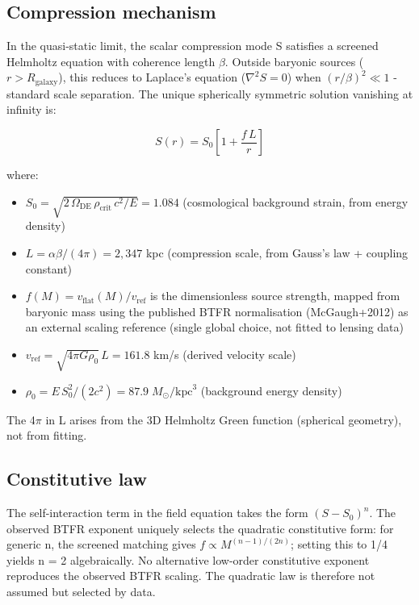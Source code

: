\documentclass[11pt,a4paper]{article}
\begin{document}
\subsection{Compression mechanism}
In the quasi-static limit, the scalar compression mode S satisfies a screened Helmholtz equation with coherence length $\beta$. Outside baryonic sources (\(r > R_{\mathrm{galaxy}}\)), this reduces to Laplace's equation (\(\nabla^2 S = 0\)) when \((r/\beta)^2 \ll 1\)  -  standard scale separation. The unique spherically symmetric solution vanishing at infinity is:

\[ S(r) = S_0\left[1 + \frac{f\,L}{r}\right] \]

where:

\begin{itemize}
  \item \(S_0 = \sqrt{2\,\Omega_{\mathrm{DE}}\,\rho_{\mathrm{crit}}\,c^2 / E} = 1.084\) (cosmological background strain, from energy density)
  \item \(L = \alpha\beta / (4\pi) = 2{,}347\) kpc (compression scale, from Gauss's law + coupling constant)
  \item \(f(M) = v_{\mathrm{flat}}(M) / v_{\mathrm{ref}}\) is the dimensionless source strength, mapped from baryonic mass using the published BTFR normalisation (McGaugh+2012) as an external scaling reference (single global choice, not fitted to lensing data)
  \item \(v_{\mathrm{ref}} = \sqrt{4\pi G\rho_0}\,L = 161.8\) km/\allowbreak{}s (derived velocity scale)
  \item \(\rho_0 = E\,S_0^2 / (2c^2) = 87.9\;M_\odot/\mathrm{kpc}^3\) (background energy density)
\end{itemize}

The 4$\pi$ in L arises from the 3D Helmholtz Green function (spherical geometry), not from fitting.

\subsection{Constitutive law}
The self-interaction term in the field equation takes the form \((S - S_0)^n\). The observed BTFR exponent uniquely selects the quadratic constitutive form: for generic n, the screened matching gives \(f \propto M^{(n-1)/(2n)}\); setting this to 1/\allowbreak{}4 yields n = 2 algebraically. No alternative low-order constitutive exponent reproduces the observed BTFR scaling. The quadratic law is therefore not assumed but selected by data.
\end{document}
